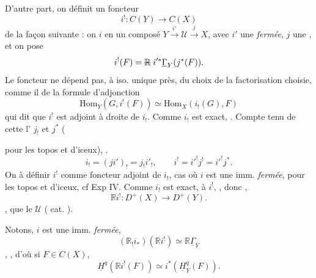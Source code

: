 \documentclass[11pt,a4paper]{article}
\begin{document}
D'autre part, on définit un foncteur
\[
i^! : C(Y) \longrightarrow C(X)
\]
de la façon suivante : on  $i$ en un composé
$Y \xrightarrow{i'} \mathcal{U} \xrightarrow{j} X$, avec $i'$ une
 \emph{fermée}, $j$ une ,
et on pose
\[
i^!(F) = \text{\struck{$\mathbb{R}$}}\; i'^* \underline{\Gamma}_Y(j^*(F)).
\]
Le foncteur ne dépend pas, à iso. unique près, du choix de la factorisation
choisie, comme il   \ill{} de la
formule d'adjonction
\[
\mathrm{Hom}_Y(G, i^!(F)) \simeq \mathrm{Hom}_X(i_!(G), F)
\]
qui dit que $i^!$ \struck{\ill{}} est adjoint à droite de $i_!$. Comme
$i_!$ est exact, \ill{} \ill{} . Compte tenu de cette
\ill{} \struck{\ill{}} \ill{} \ill{} l' \ill{} $j_!$
et $j^*$ (

 pour les topos et \ill{} d'iceux), \ill{} \ill{} \ill{}
.
\[
i_! = (j i')_! = j_! i'_! , \qquad i^! = i'^! j^! = i'^! j^* .
\]
On  à définir \struck{\ill{}} \struck{\ill{} \ill{}}
$i^!$ comme foncteur adjoint de $i_!$, \ill{}  cas où $i$
est une imm. \emph{fermée}, \ill{} \ill{} \ill{} \ill{} 
 \ill{} pour les topos et \ill{} d'iceux,
cf Exp IV.
\struck{\ill{}} Comme $i_!$ est exact, \ill{} \ill{} \ill{}
 à  \ill{} $i^!$, \ill{} \ill{}
, donc \ill{} \ill{} \emph{},
\struck{\ill{}} \ill{} \ill{}
\[
\mathbb{R} i^! : D^+(X) \longrightarrow D^+(Y).
\]
\ill{} \ill{} \ill{} \ill{} \ill{}, \ill{} \ill{} que le
 \emph{\ill{}} \ill{} $\mathcal{U}$
(\struck{\ill{}} \ill{} cat. ). \struck{\ill{}}

\struck{\ill{}}

Notons, \ill{} $i$ est une imm. \emph{fermée},
\[
(\mathbb{R}_! i_*)(\mathbb{R} i^!) \simeq \mathbb{R} \underline{\Gamma}_Y
\]
\ill{} \ill{}, \ill{} \ill{} \ill{} \ill{}, d'où \ill{} si
$F \in C(X)$, \ill{} \ill{}
\[
\underline{H}^q(\mathbb{R} i^!(F)) \simeq i^*(\underline{H}^q_Y(F)).
\]
\end{document}
